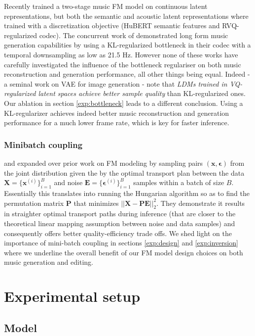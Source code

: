 Recently \citet{prajwalmusicflow} trained a two-stage music FM model on continuous latent representations, but both the semantic and acoustic latent representations where trained with a discretization objective (HuBERT semantic features and RVQ-regularized codec).
The concurrent work of \citet{evans2024longform} demonstrated long form music generation capabilities by using a KL-regularized bottleneck in their codec with a temporal downsampling as low as 21.5 Hz.
However none of these works have carefully investigated the influence of the bottleneck regulariser on both music reconstruction and generation performance, all other things being equal.  
Indeed \citet{rombach2022high} - a seminal work on VAE for image generation - note that \textit{LDMs trained in VQ-regularized latent spaces achieve better sample quality} than KL-regularized ones. 
Our ablation in section \ref{exp:bottleneck} leads to a different conclusion.
Using a KL-regularizer achieves indeed better music reconstruction and generation performance for a much lower frame rate, which is key for faster inference.

\subsubsection{Minibatch coupling}
\citet{tong2023improving} and \citet{pooladian2023multisample} expanded over prior work on FM modeling by sampling pairs $(\mathbf{x},\mathbf{\epsilon})$ from the joint distribution given the by the optimal transport plan between the data $\mathbf{X} = \{{\mathbf{x}^{(i)}}\}_{i=1}^B$ and noise $\mathbf{E} = \{{\mathbf{\epsilon}^{(i)}}\}_{i=1}^B$ samples within a batch of size $B$. Essentially this translates into running the Hungarian algorithm so as to find the permutation matrix $\mathbf{P}$ that minimizes $||\mathbf{X}-\mathbf{P}\mathbf{E}||_2^2$.
They demonstrate it results in straighter optimal transport paths during inference (that are closer to the theoretical linear mapping assumption between noise and data samples) and consequently offers better quality-efficiency trade offs. We shed light on the importance of mini-batch coupling in sections \ref{exp:design} and \ref{exp:inversion} where we underline the overall benefit of our FM model design choices on both music generation and editing.

\section{Experimental setup}
\subsection{Model}

